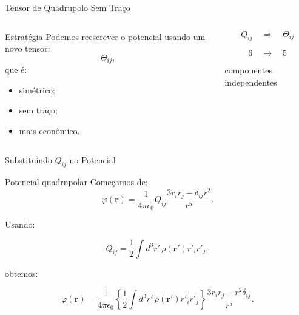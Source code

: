 \documentclass[aspectratio=169]{beamer}
\begin{document}

\begin{frame}{Tensor de Quadrupolo Sem Traço}

\begin{columns}[T]


\small

\begin{mybox}{Estratégia}
Podemos reescrever o potencial usando um novo tensor:
\[
\Theta_{ij},
\]
que é:
\begin{itemize}
\item simétrico;
\item sem traço;
\item mais econômico.
\end{itemize}
\end{mybox}


\begin{center}

\Large
\[
Q_{ij}
\quad
\Longrightarrow
\quad
\Theta_{ij}
\]

\vspace{0.5cm}

\Large
\[
6
\quad\longrightarrow\quad
5
\]

\vspace{0.2cm}

componentes independentes

\end{center}

\end{columns}

\end{frame}




\begin{frame}{Substituindo \(Q_{ij}\) no Potencial}

\begin{mybox}{Potencial quadrupolar}
Começamos de:
\[
\varphi(\mathbf r)
=
\frac{1}{4\pi\epsilon_0}
Q_{ij}
\frac{3r_i r_j-\delta_{ij}r^2}{r^5}.
\]
\end{mybox}

Usando:

\[
Q_{ij}
=
\frac12
\int d^3r'\,
\rho(\mathbf r')r'_i r'_j,
\]

obtemos:

\begin{eqbox}
\begin{equation}
\varphi(\mathbf r)
=
\frac{1}{4\pi\epsilon_0}
\left\{
\frac12
\int d^3r'\,
\rho(\mathbf r')r'_i r'_j
\right\}
\frac{3r_i r_j-r^2\delta_{ij}}{r^5}.
\tag{4.60}
\end{equation}
\end{eqbox}

\end{frame}
\end{document}
